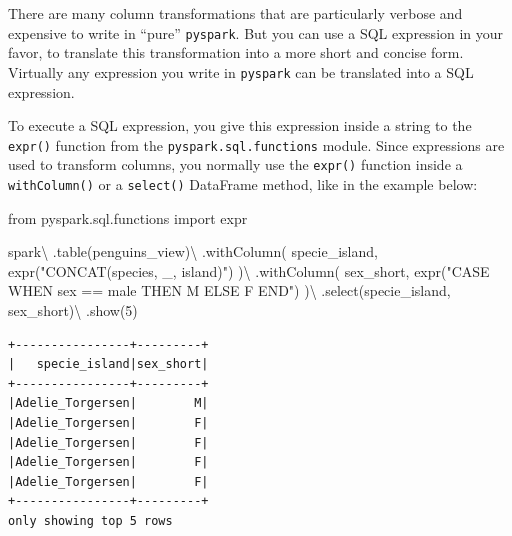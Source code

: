 \documentclass[
  11pt,
  letterpaper,
  DIV=11,
  numbers=noendperiod]{scrreprt}
\newenvironment{Shaded}{\begin{snugshade}}{\end{snugshade}}
\newcommand{\DecValTok}[1]{\textcolor[rgb]{0.68,0.00,0.00}{#1}}
\newcommand{\ImportTok}[1]{\textcolor[rgb]{0.00,0.46,0.62}{#1}}
\newcommand{\NormalTok}[1]{\textcolor[rgb]{0.00,0.23,0.31}{#1}}
\newcommand{\OperatorTok}[1]{\textcolor[rgb]{0.37,0.37,0.37}{#1}}
\newcommand{\StringTok}[1]{\textcolor[rgb]{0.13,0.47,0.30}{#1}}
\begin{document}
There are many column transformations that are particularly verbose and
expensive to write in ``pure'' \texttt{pyspark}. But you can use a SQL
expression in your favor, to translate this transformation into a more
short and concise form. Virtually any expression you write in
\texttt{pyspark} can be translated into a SQL expression.

To execute a SQL expression, you give this expression inside a string to
the \texttt{expr()} function from the \texttt{pyspark.sql.functions}
module. Since expressions are used to transform columns, you normally
use the \texttt{expr()} function inside a \texttt{withColumn()} or a
\texttt{select()} DataFrame method, like in the example below:

\begin{Shaded}
\begin{Highlighting}[]
\ImportTok{from}\NormalTok{ pyspark.sql.functions }\ImportTok{import}\NormalTok{ expr}

\NormalTok{spark}\OperatorTok{\textbackslash{}}
\NormalTok{  .table(}\StringTok{\textquotesingle{}penguins\_view\textquotesingle{}}\NormalTok{)}\OperatorTok{\textbackslash{}}
\NormalTok{  .withColumn(}
    \StringTok{\textquotesingle{}specie\_island\textquotesingle{}}\NormalTok{,}
\NormalTok{    expr(}\StringTok{"CONCAT(species, \textquotesingle{}\_\textquotesingle{}, island)"}\NormalTok{)}
\NormalTok{  )}\OperatorTok{\textbackslash{}}
\NormalTok{  .withColumn(}
    \StringTok{\textquotesingle{}sex\_short\textquotesingle{}}\NormalTok{,}
\NormalTok{    expr(}\StringTok{"CASE WHEN sex == \textquotesingle{}male\textquotesingle{} THEN \textquotesingle{}M\textquotesingle{} ELSE \textquotesingle{}F\textquotesingle{} END"}\NormalTok{)}
\NormalTok{  )}\OperatorTok{\textbackslash{}}
\NormalTok{  .select(}\StringTok{\textquotesingle{}specie\_island\textquotesingle{}}\NormalTok{, }\StringTok{\textquotesingle{}sex\_short\textquotesingle{}}\NormalTok{)}\OperatorTok{\textbackslash{}}
\NormalTok{  .show(}\DecValTok{5}\NormalTok{)}
\end{Highlighting}
\end{Shaded}

\begin{verbatim}
+----------------+---------+
|   specie_island|sex_short|
+----------------+---------+
|Adelie_Torgersen|        M|
|Adelie_Torgersen|        F|
|Adelie_Torgersen|        F|
|Adelie_Torgersen|        F|
|Adelie_Torgersen|        F|
+----------------+---------+
only showing top 5 rows
\end{verbatim}
\end{document}
